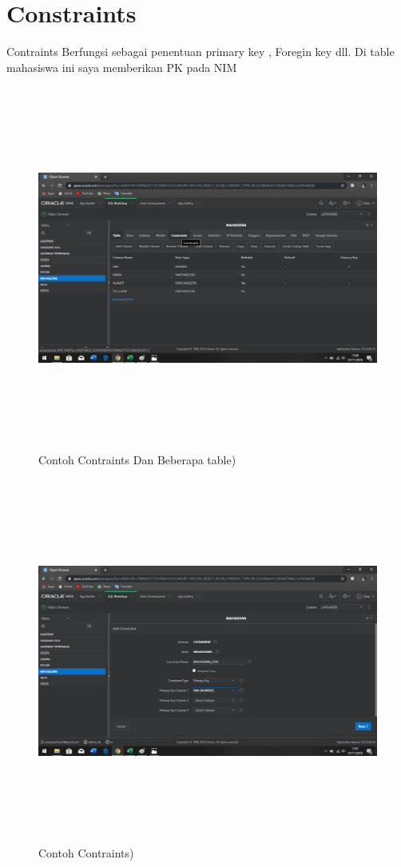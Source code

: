 \documentclass[a4, 13pt]{article}
\begin{document}
     \section{Constraints}
     Contraints Berfungsi sebagai penentuan primary key , Foregin key dll. Di table mahasiswa ini saya memberikan PK pada NIM
    \begin{figure}[!htbp]
        \centering
        \includegraphics[width=16cm, height=12cm]{pictures/E.png}
        \caption{Contoh Contraints Dan Beberapa table)}
        \label{fig:my_label}
    \end{figure}
     \begin{figure}[!htbp]
        \centering
        \includegraphics[width=16cm, height=12cm]{pictures/F.png}
        \caption{Contoh Contraints)}
        \label{fig:my_label}
    \end{figure}
\end{document}

